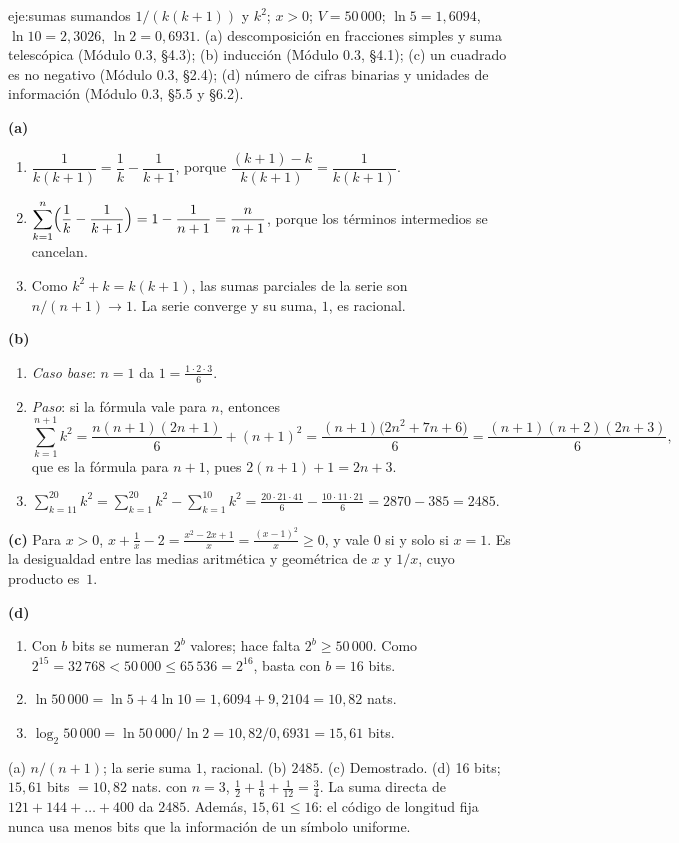 \begin{solucion}{eje:sumas}
\datos sumandos $1/(k(k+1))$ y $k^{2}$; $x>0$; $V=50\,000$; $\ln5=1{,}6094$, $\ln10=2{,}3026$, $\ln2=0{,}6931$.
\planteamiento (a) descomposición en fracciones simples y suma telescópica (Módulo 0.3, §4.3); (b) inducción (Módulo 0.3, §4.1); (c) un cuadrado es no negativo (Módulo 0.3, §2.4); (d) número de cifras binarias y unidades de información (Módulo 0.3, §5.5 y §6.2).
\pasos

\noindent\textbf{(a)}
\begin{enumerate}[label=\arabic*.]
  \item $\dfrac{1}{k(k+1)}=\dfrac1k-\dfrac{1}{k+1}$, porque $\dfrac{(k+1)-k}{k(k+1)}=\dfrac{1}{k(k+1)}$.
  \item $\displaystyle\sum_{k=1}^{n}\Bigl(\frac1k-\frac1{k+1}\Bigr)=1-\frac{1}{n+1}=\frac{n}{n+1}$, porque los términos intermedios se cancelan.
  \item Como $k^{2}+k=k(k+1)$, las sumas parciales de la serie son $n/(n+1)\to1$. La serie converge y su suma, $1$, es racional.
\end{enumerate}

\noindent\textbf{(b)}
\begin{enumerate}[label=\arabic*.]
  \item \emph{Caso base}: $n=1$ da $1=\frac{1\cdot2\cdot3}{6}$.
  \item \emph{Paso}: si la fórmula vale para $n$, entonces
  \[
  \sum_{k=1}^{n+1}k^{2}=\frac{n(n+1)(2n+1)}{6}+(n+1)^{2}=\frac{(n+1)\bigl(2n^{2}+7n+6\bigr)}{6}=\frac{(n+1)(n+2)(2n+3)}{6},
  \]
  que es la fórmula para $n+1$, pues $2(n+1)+1=2n+3$.
  \item $\displaystyle\sum_{k=11}^{20}k^{2}=\sum_{k=1}^{20}k^{2}-\sum_{k=1}^{10}k^{2}=\frac{20\cdot21\cdot41}{6}-\frac{10\cdot11\cdot21}{6}=2870-385=2485$.
\end{enumerate}

\noindent\textbf{(c)} Para $x>0$, $x+\frac1x-2=\frac{x^{2}-2x+1}{x}=\frac{(x-1)^{2}}{x}\ge0$, y vale $0$ si y solo si $x=1$. Es la desigualdad entre las medias aritmética y geométrica de $x$ y $1/x$, cuyo producto es~$1$.

\noindent\textbf{(d)}
\begin{enumerate}[label=\arabic*.]
  \item Con $b$ bits se numeran $2^{b}$ valores; hace falta $2^{b}\ge50\,000$. Como $2^{15}=32\,768<50\,000\le65\,536=2^{16}$, basta con $b=16$ bits.
  \item $\ln50\,000=\ln5+4\ln10=1{,}6094+9{,}2104=10{,}82$ nats.
  \item $\log_2 50\,000=\ln50\,000/\ln2=10{,}82/0{,}6931=15{,}61$ bits.
\end{enumerate}
\resultado (a) $n/(n+1)$; la serie suma $1$, racional. (b) $2485$. (c) Demostrado. (d) 16 bits; $15{,}61$ bits $=10{,}82$ nats.
\comprobacion con $n=3$, $\frac12+\frac16+\frac1{12}=\frac34$. La suma directa de $121+144+\dots+400$ da $2485$. Además, $15{,}61\le16$: el código de longitud fija nunca usa menos bits que la información de un símbolo uniforme.


\end{solucion}
